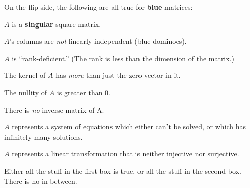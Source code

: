 On the flip side, the following are all true for \textbf{blue} matrices:

\begin{framed}
\begin{compactitem}
\item $A$ is a \textbf{singular} square matrix.
\item $A$'s columns are \textit{not} linearly independent (blue dominoes).
\item $A$ is ``rank-deficient.'' (The rank is less than the dimension of the
matrix.)
\item The kernel of $A$ has \textit{more} than just the zero vector in it.
\item The nullity of $A$ is greater than 0.
\item There is \textit{no} inverse matrix of A.
\item $A$ represents a system of equations which either can't be solved, or
which has infinitely many solutions.
\item $A$ represents a linear transformation that is neither injective nor
surjective.
\end{compactitem}
\end{framed}

Either all the stuff in the first box is true, or all the stuff in the second
box. There is no in between.
